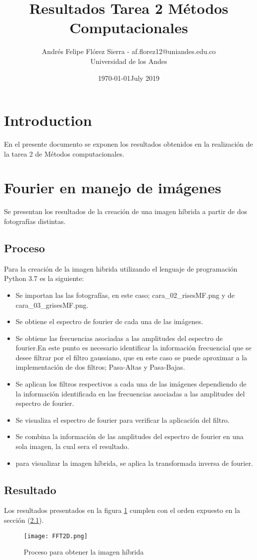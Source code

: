 \documentclass{article} %
\date{\today}
\title{Resultados Tarea 2 Métodos Computacionales}
\author{Andrés Felipe Flórez Sierra - af.florez12@uniandes.edu.co\\Universidad de los Andes}
\date{July 2019}
\begin{document}
\maketitle

\section{Introduction}
En el presente documento se exponen los resultados obtenidos en la realización de la tarea 2 de Métodos computacionales.
\section{Fourier en manejo de imágenes}
Se presentan los resultados de la creación de una imagen híbrida a partir de dos fotografías distintas.
\subsection{Proceso}\label{sub:proces_fourier}
Para la creación de la imagen hibrida utilizando el lenguaje de programación Python 3.7 es la siguiente:
\begin{itemize}
    \item Se importan las las fotografías, en este caso; cara\_02\_risesMF.png y de cara\_03\_grisesMF.png.
    \item Se obtiene el espectro de fourier de cada una de las imágenes.
    \item Se obtiene las frecuencias asociadas a las amplitudes del espectro de fourier.En este punto es necesario identificar la información frecuencial que se desee filtrar por el filtro gaussiano, que en este caso se puede aproximar a la implementación de dos filtros; Pasa-Altas y Pasa-Bajas.
    \item Se aplican los filtros respectivos a cada una de las imágenes dependiendo de la información identificada en las frecuencias asociadas a las amplitudes del espectro de fourier.
    \item Se visualiza el espectro de fourier para verificar la aplicación del filtro.
    \item Se combina la información de las amplitudes del espectro de fourier en una sola imagen, la cual sera el resultado.
    \item para visualizar la imagen híbrida, se aplica la transformada inversa de fourier.
\end{itemize}

\subsection{Resultado}
Los resultados presentados en la figura \ref{fig:proces_fourier}  cumplen con el orden expuesto en la sección  (\ref{sub:proces_fourier}).
\begin{figure}[H]
    \texttt{[image: FFT2D.png]}
    \caption{Proceso para obtener la imagen híbrida }
    \label{fig:proces_fourier}
\end{figure}
\end{document}
